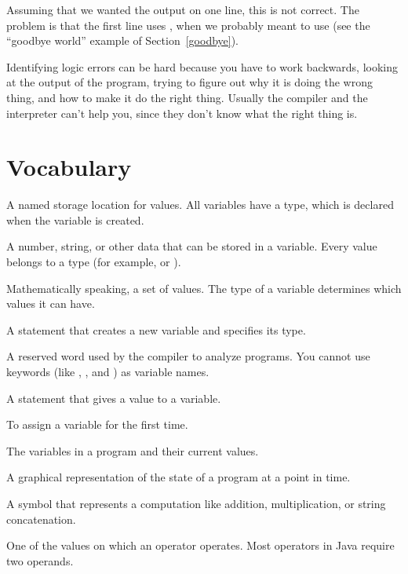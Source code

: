 Assuming that we wanted the output on one line, this is not correct.
The problem is that the first line uses , when we probably meant to use  (see the ``goodbye world'' example of Section~\ref{goodbye}).

Identifying logic errors can be hard because you have to work backwards, looking at the output of the program, trying to figure out why it is doing the wrong thing, and how to make it do the right thing.
Usually the compiler and the interpreter can't help you, since they don't know what the right thing is.


\section{Vocabulary}

\begin{description}

A named storage location for values.
All variables have a type, which is declared when the variable is created.

A number, string, or other data that can be stored in a variable.
Every value belongs to a type (for example,  or ).

Mathematically speaking, a set of values.
The type of a variable determines which values it can have.

A statement that creates a new variable and specifies its type.

A reserved word used by the compiler to analyze programs.
You cannot use keywords (like , , and ) as variable names.

A statement that gives a value to a variable.

To assign a variable for the first time.


The variables in a program and their current values.

A graphical representation of the state of a program at a point in time.

A symbol that represents a computation like addition, multiplication, or string concatenation.

One of the values on which an operator operates.
Most operators in Java require two operands.


\end{description}
